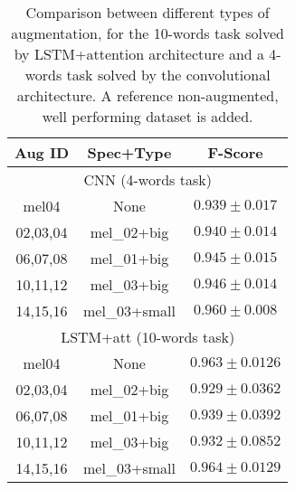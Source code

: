 \begin{table}[t!]
    \centering
    \caption{Comparison between different types of augmentation,
    for the 10-words task solved by LSTM+attention architecture and a
    4-words task solved by the convolutional architecture.
    A reference non-augmented, well performing dataset is added.}
    \label{tab:augmentation_comparison_performance}
    \begin{tabular}{|cc|c|}
        \hline
        Aug ID & Spec+Type & F-Score \\
        \hline
        \hline
        \multicolumn{3}{|c|}{CNN (4-words task)} \\
        \hline
        mel04 & None & $0.939 \pm 0.017$ \\
        02,03,04 & mel\_02+big   & $0.940 \pm 0.014$ \\
        06,07,08 & mel\_01+big   & $0.945 \pm 0.015$ \\
        10,11,12 & mel\_03+big   & $0.946 \pm 0.014$ \\
        14,15,16 & mel\_03+small & $0.960 \pm 0.008$ \\
        \hline
        \hline
        \multicolumn{3}{|c|}{LSTM+att (10-words task)} \\
        \hline
        mel04   &  None & $0.963 \pm 0.0126$ \\
        02,03,04 & mel\_02+big   &  $0.929 \pm 0.0362$ \\
        06,07,08 & mel\_01+big   &  $0.939 \pm 0.0392$ \\
        10,11,12 & mel\_03+big   &  $0.932 \pm 0.0852$ \\
        14,15,16 & mel\_03+small &  $0.964 \pm 0.0129$ \\
        \hline
    \end{tabular}
\end{table}

